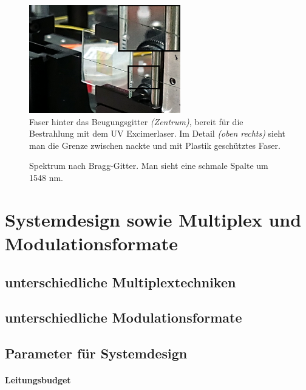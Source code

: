 \documentclass[a4paper]{article}
\begin{document}
\begin{figure}[H]
  \centering
  \includegraphics{./messungen/gitter.png}
  \caption{Faser hinter das Beugungsgitter \emph{(Zentrum)}, bereit für die
  Bestrahlung mit dem UV Excimerlaser. Im Detail \emph{(oben rechts)} sieht man
die Grenze zwischen nackte und mit Plastik geschütztes Faser.}
  \label{fig:gitt}
\end{figure}

\begin{figure}[H]
  \centering
  \caption{Spektrum nach Bragg-Gitter. Man sieht eine schmale Spalte um 1548
  nm.}
  \label{fig:bragg}
\end{figure}



\newpage
\section{Systemdesign sowie Multiplex und Modulationsformate}
\subsection{unterschiedliche Multiplextechniken}
\subsection{unterschiedliche Modulationsformate}
\subsection{Parameter für Systemdesign}
\paragraph{Leitungsbudget}
\end{document}
